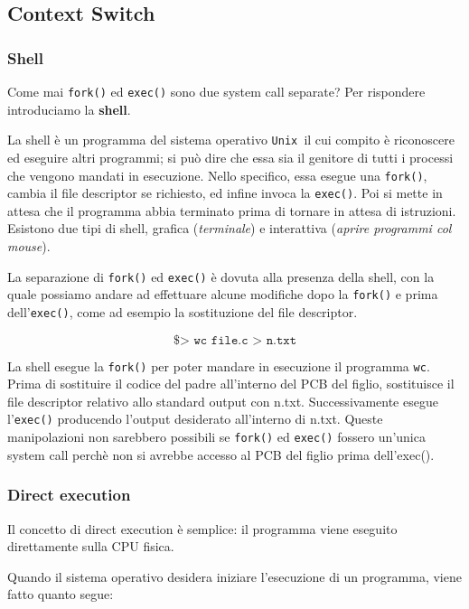 \documentclass[12pt, twoside, letterpaper]{article}
\begin{document}
		\subsection{Context Switch}
		
			\subsubsection{Shell}
				
				Come mai \texttt{fork()} ed \texttt{exec()} sono due system call separate? Per rispondere introduciamo la \textbf{shell}.
				
				La shell è un programma del sistema operativo \texttt{Unix }il cui compito è riconoscere ed eseguire altri programmi; si può dire che essa sia il genitore di tutti i processi che vengono mandati in esecuzione. Nello specifico, essa esegue una \texttt{fork()}, cambia il file descriptor se richiesto, ed infine invoca la \texttt{exec()}. Poi si mette in attesa che il programma abbia terminato prima di tornare in attesa di istruzioni. Esistono due tipi di shell, grafica (\textit{terminale}) e interattiva (\textit{aprire programmi col mouse}). 
				
				La separazione di \texttt{fork()} ed \texttt{exec()} è dovuta alla presenza della shell, con la quale possiamo andare ad effettuare alcune modifiche dopo la \texttt{fork()} e prima dell'\texttt{exec()}, come ad esempio la sostituzione del file descriptor. 
				
				$$\texttt{\$> wc file.c > n.txt}$$
				
				La shell esegue la \texttt{fork()} per poter mandare in esecuzione il programma \texttt{wc}. Prima di sostituire il codice del padre all'interno del PCB del figlio, sostituisce il file descriptor relativo allo standard output con n.txt. Successivamente esegue l'\texttt{exec()} producendo l'output desiderato all'interno di n.txt. Queste manipolazioni non sarebbero possibili se \texttt{fork()} ed \texttt{exec()} fossero un'unica system call perchè non si avrebbe accesso al PCB del figlio prima dell'exec().
				
			\subsubsection{Direct execution}
			
				Il concetto di direct execution è semplice: il programma viene eseguito direttamente sulla CPU fisica.
				
				Quando il sistema operativo desidera iniziare l'esecuzione di un programma, viene fatto quanto segue: 
				
\end{document}
